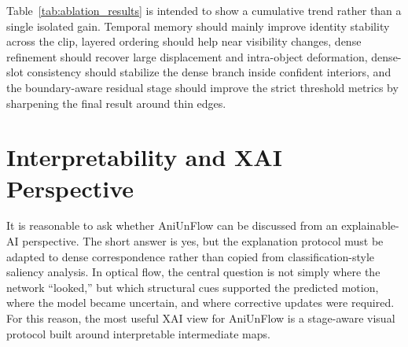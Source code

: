 Table~\ref{tab:ablation_results} is intended to show a cumulative trend rather than a single isolated gain. Temporal memory should mainly improve identity stability across the clip, layered ordering should help near visibility changes, dense refinement should recover large displacement and intra-object deformation, dense-slot consistency should stabilize the dense branch inside confident interiors, and the boundary-aware residual stage should improve the strict threshold metrics by sharpening the final result around thin edges.

\section{Interpretability and XAI Perspective}

It is reasonable to ask whether AniUnFlow can be discussed from an explainable-AI perspective. The short answer is yes, but the explanation protocol must be adapted to dense correspondence rather than copied from classification-style saliency analysis. In optical flow, the central question is not simply where the network ``looked,'' but which structural cues supported the predicted motion, where the model became uncertain, and where corrective updates were required. For this reason, the most useful XAI view for AniUnFlow is a stage-aware visual protocol built around interpretable intermediate maps.

